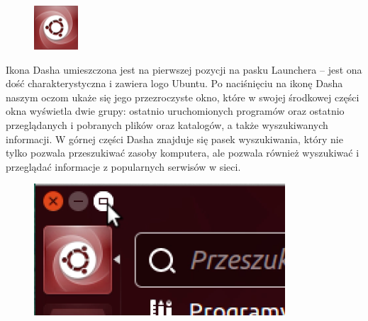 \begin{figure}
                \includegraphics[width=\linewidth]{images/ikony_dash.png}
\end{figure}

Ikona Dasha umieszczona jest na pierwszej pozycji na pasku Launchera – jest ona dość charakterystyczna i zawiera logo Ubuntu. Po naciśnięciu na ikonę Dasha naszym oczom ukaże się jego przezroczyste okno, które w swojej środkowej części okna wyświetla dwie grupy: ostatnio uruchomionych programów oraz ostatnio przeglądanych i pobranych plików oraz katalogów, a także wyszukiwanych informacji. W górnej części Dasha znajduje się pasek wyszukiwania, który nie tylko pozwala przeszukiwać zasoby komputera, ale pozwala również wyszukiwać i przeglądać informacje z popularnych serwisów w sieci. 

\begin{figure}
                \includegraphics[width=\linewidth]{images/unity_dash_max.png}
\end{figure}

